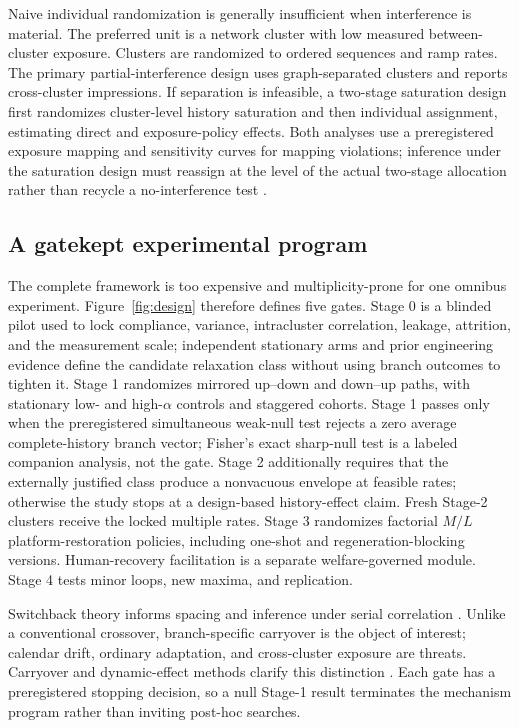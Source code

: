 \documentclass[10pt,a4paper]{article}
\begin{document}
Naive individual randomization is generally insufficient when interference is material. The preferred unit is a network cluster with low measured between-cluster exposure. Clusters are randomized to ordered sequences and ramp rates. The primary partial-interference design uses graph-separated clusters and reports cross-cluster impressions. If separation is infeasible, a two-stage saturation design first randomizes cluster-level history saturation and then individual assignment, estimating direct and exposure-policy effects. Both analyses use a preregistered exposure mapping and sensitivity curves for mapping violations; inference under the saturation design must reassign at the level of the actual two-stage allocation rather than recycle a no-interference test \cite{hudgens2008interference,aronow2017interference,liu2026saturation}.

\subsection{A gatekept experimental program}

The complete framework is too expensive and multiplicity-prone for one omnibus experiment. Figure~\ref{fig:design} therefore defines five gates. Stage 0 is a blinded pilot used to lock compliance, variance, intracluster correlation, leakage, attrition, and the measurement scale; independent stationary arms and prior engineering evidence define the candidate relaxation class without using branch outcomes to tighten it. Stage 1 randomizes mirrored up--down and down--up paths, with stationary low- and high-$\alpha$ controls and staggered cohorts. Stage 1 passes only when the preregistered simultaneous weak-null test rejects a zero average complete-history branch vector; Fisher's exact sharp-null test is a labeled companion analysis, not the gate. Stage 2 additionally requires that the externally justified class produce a nonvacuous envelope at feasible rates; otherwise the study stops at a design-based history-effect claim. Fresh Stage-2 clusters receive the locked multiple rates. Stage 3 randomizes factorial $M/L$ platform-restoration policies, including one-shot and regeneration-blocking versions. Human-recovery facilitation is a separate welfare-governed module. Stage 4 tests minor loops, new maxima, and replication.

Switchback theory informs spacing and inference under serial correlation \cite{bojinov2023switchback}. Unlike a conventional crossover, branch-specific carryover is the object of interest; calendar drift, ordinary adaptation, and cross-cluster exposure are threats. Carryover and dynamic-effect methods clarify this distinction \cite{wang2024carryover,sun2025dynamic}. Each gate has a preregistered stopping decision, so a null Stage-1 result terminates the mechanism program rather than inviting post-hoc searches.
\end{document}

